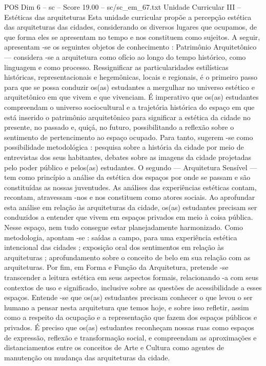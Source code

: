 \begin{textsample}{POS Dim 6 – sc – Score 19.00 – sc/sc\_em\_67.txt}
Unidade Curricular III – Estéticas das arquiteturas Esta unidade curricular propõe a percepção estética das arquiteturas das cidades, considerando os diversos lugares que ocupamos, de que forma eles se apresentam no tempo e nos constituem como sujeitos.
A seguir, apresentam -se os seguintes objetos de conhecimento : Patrimônio Arquitetônico — considera -se a arquitetura como ofício ao longo do tempo histórico, como linguagem e como processo.
Ressignificar as particularidades estilísticas históricas, representacionais e hegemônicas, locais e regionais, é o primeiro passo para que se possa conduzir os(as) estudantes a mergulhar no universo estético e arquitetônico em que vivem e que vivenciam.
É imperativo que os(as) estudantes compreendam o universo sociocultural e a trajetória histórica do espaço em que está inserido o patrimônio arquitetônico para significar a estética da cidade no presente, no passado e, quiçá, no futuro, possibilitando a reflexão sobre o sentimento de pertencimento ao espaço ocupado.
Para tanto, sugerem -se como possibilidade metodológica : pesquisa sobre a história da cidade por meio de entrevistas dos seus habitantes, debates sobre as imagens da cidade projetadas pelo poder público e pelos(as) estudantes.
O segundo — Arquitetura Sensível — tem como princípio a análise da estética dos espaços por onde se passam e são constituídas as nossas juventudes.
As análises das experiências estéticas contam, recontam, atravessam -nos e nos constituem como atores sociais.
Ao aprofundar esta análise em relação às arquiteturas da cidade, os(as) estudantes precisam ser conduzidos a entender que vivem em espaços privados em meio à coisa pública.
Nesse espaço, nem tudo consegue estar planejadamente harmonizado.
Como metodologia, apontam -se : saídas a campo, para uma experiência estética intencional das cidades ; exposição oral dos sentimentos em relação às arquiteturas ; aprofundamento sobre o conceito de belo em sua relação com as arquiteturas.
Por fim, em Forma e Função da Arquitetura, pretende -se transcender a leitura estética em seus aspectos formais, relacionando -a com seus contextos de uso e significado, inclusive sobre as questões de acessibilidade a esses espaços.
Entende -se que os(as) estudantes precisam conhecer o que levou o ser humano a pensar nesta arquitetura que temos hoje, e sobre isso refletir, assim como a respeito da ocupação e a representação que fazem dos espaços públicos e privados.
É preciso que os(as) estudantes reconheçam nossas ruas como espaços de expressão, reflexão e transformação social, e compreendam as aproximações e distanciamentos entre os conceitos de Arte e Cultura como agentes de manutenção ou mudança das arquiteturas da cidade.

\end{textsample}
